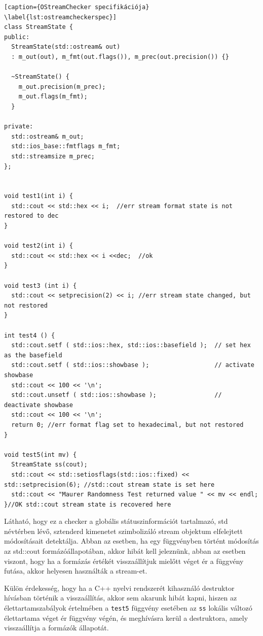 \documentclass[a4paper,12pt]{report}
\begin{document}
\begin{lstlisting}[caption={OStreamChecker specifikációja}
\label{lst:ostreamcheckerspec}]
class StreamState {
public:
  StreamState(std::ostream& out)
  : m_out(out), m_fmt(out.flags()), m_prec(out.precision()) {}

  ~StreamState() {
    m_out.precision(m_prec);
    m_out.flags(m_fmt);
  }

private:
  std::ostream& m_out;
  std::ios_base::fmtflags m_fmt;
  std::streamsize m_prec;
};


void test1(int i) {
  std::cout << std::hex << i;  //err stream format state is not restored to dec
}

void test2(int i) {
  std::cout << std::hex << i <<dec;  //ok
}

void test3 (int i) {
  std::cout << setprecision(2) << i; //err stream state changed, but not restored
}

int test4 () {
  std::cout.setf ( std::ios::hex, std::ios::basefield );  // set hex as the basefield
  std::cout.setf ( std::ios::showbase );                  // activate showbase
  std::cout << 100 << '\n';
  std::cout.unsetf ( std::ios::showbase );                // deactivate showbase
  std::cout << 100 << '\n';
  return 0; //err format flag set to hexadecimal, but not restored
}

void test5(int mv) {
  StreamState ss(cout);
  std::cout << std::setiosflags(std::ios::fixed) << std::setprecision(6); //std::cout stream state is set here
  std::cout << "Maurer Randomness Test returned value " << mv << endl;
}//OK std::cout stream state is recovered here
\end{lstlisting}

Látható, hogy ez a checker a globális státuszinformációt tartalmazó, std névtérben lévő, sztenderd kimenetet szimbolizáló stream objektum elfelejtett módosításait detektálja. Abban az esetben, ha egy függvényben történt módosítás az std::cout formázóállapotában, akkor hibát kell jeleznünk, abban az esetben viszont, hogy ha a formázás értékét visszaállítjuk mielőtt véget ér a függvény futása, akkor helyesen használták a stream-et.

Külön érdekesség, hogy ha a C++ nyelvi rendszerét kihasználó destruktor hívásban történik a visszaállítás, akkor sem akarunk hibát kapni, hiszen az élettartamszabályok értelmében a \texttt{test5} függvény esetében az \texttt{ss} lokális változó élettartama véget ér függvény végén, és meghívásra kerül a destruktora, amely visszaállítja a formázók állapotát.
\end{document}
